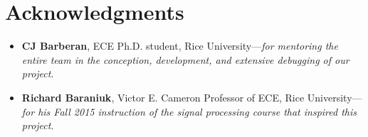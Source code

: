 \documentclass[journal]{IEEEtran}
\begin{document}
\section*{Acknowledgments}
\begin{itemize}
	\item \textbf{CJ Barberan}, ECE Ph.D. student, Rice University---\textit{for mentoring the entire team in the conception, development, and extensive debugging of our project}.
	\item \textbf{Richard Baraniuk}, Victor E. Cameron Professor of ECE, Rice University---\textit{for his Fall 2015 instruction of the signal processing course that inspired this project}.
\end{itemize}
\end{document}
